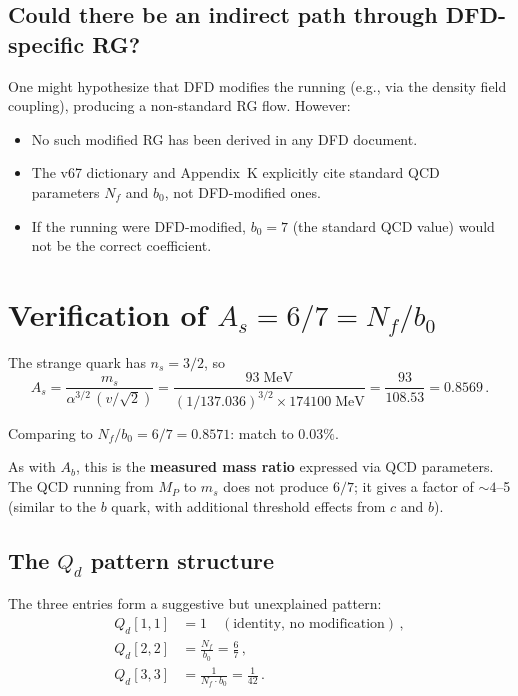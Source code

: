 \documentclass[11pt,a4paper]{article}
\newcommand{\Nf}{N_f}
\theoremstyle{definition}
\theoremstyle{remark}
\begin{document}
\subsection{Could there be an indirect path through DFD-specific RG?}

One might hypothesize that DFD modifies the running (e.g., via the
density field coupling), producing a non-standard RG flow.  However:
\begin{itemize}
\item No such modified RG has been derived in any DFD document.
\item The v67 dictionary and Appendix~K explicitly cite standard QCD
  parameters $\Nf$ and $b_0$, not DFD-modified ones.
\item If the running were DFD-modified, $b_0 = 7$ (the standard QCD value)
  would not be the correct coefficient.
\end{itemize}

\section{Verification of $A_s = 6/7 = \Nf/b_0$}
\label{sec:strange}

The strange quark has $n_s = 3/2$, so
\begin{equation}
A_s = \frac{m_s}{\alpha^{3/2}\,(v/\sqrt{2})} = \frac{93\;\text{MeV}}{(1/137.036)^{3/2} \times 174100\;\text{MeV}}
= \frac{93}{108.53} = 0.8569\,.
\end{equation}

Comparing to $\Nf/b_0 = 6/7 = 0.8571$: match to $0.03\%$.

As with $A_b$, this is the \textbf{measured mass ratio} expressed via QCD
parameters.  The QCD running from $M_P$ to $m_s$ does not produce $6/7$;
it gives a factor of $\sim 4$--5 (similar to the $b$ quark, with additional
threshold effects from $c$ and $b$).

\subsection{The $Q_d$ pattern structure}

The three entries form a suggestive but unexplained pattern:
\begin{align}
Q_d[1,1] &= 1 \quad (\text{identity, no modification})\,, \\
Q_d[2,2] &= \frac{\Nf}{b_0} = \frac{6}{7}\,, \\
Q_d[3,3] &= \frac{1}{\Nf \cdot b_0} = \frac{1}{42}\,.
\end{align}
\end{document}
